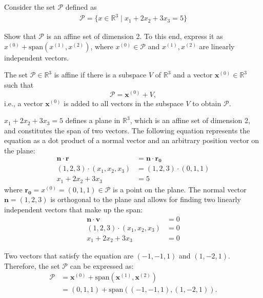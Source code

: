 \begin{homeworkProblem}

    Consider the set $\mathcal P$ defined as
    \[
        \begin{split}
            \mathcal P=\{x\in\mathbb R^3 \;|\; x_1+2x_2+3x_3=5\}
        \end{split}
    \]

    Show that $\mathcal P$ is an affine set of dimension 2. To this end, express 
    it as $x^{(0)}+\text{span}(x^{(1)},x^{(2)})$, where $x^{(0)}\in\mathcal P$ 
    and $x^{(1)},x^{(2)}$ are linearly independent vectors. 
    \\ 

    \begin{solution}
        The set $\mathcal{P} \in \mathbb{R}^3$ is affine if there is a subspace $V$
        of $\mathbb{R}^3$ and a vector $\boldsymbol{x}^{(0)} \in \mathbb{R}^3$ such that
        $$\mathcal{P} = \boldsymbol{x}^{(0)} + V,$$ i.e., a vector $\boldsymbol{x}^{(0)}$
        is added to all vectors in the subspace $V$ to obtain $\mathcal{P}$.

        $x_1 + 2x_2 + 3x_3 = 5$ defines a plane in $\mathbb{R}^3$, which is an affine set
        of dimension 2, and constitutes the span of two vectors. The following equation
        represents the equation as a dot product of a normal vector and an arbitrary
        position vector on the plane:
        \[
            \begin{split}
                \boldsymbol{n} \cdot \boldsymbol{r} &= \boldsymbol{n} \cdot \boldsymbol{r_0} \\
                (1, 2, 3) \cdot (x_1, x_2, x_3) &= (1, 2, 3) \cdot (0, 1, 1) \\ 
                x_1 + 2x_2 + 3x_3 &= 5
            \end{split}
        \]
        where $\boldsymbol{r_0} = x^{(0)} = (0, 1, 1) \in \mathcal{P}$ is a point on the plane.
        The normal vector $\boldsymbol{n} = (1, 2, 3)$ is orthogonal to the plane and allows
        for finding two linearly independent vectors that make up the span:
        \[
            \begin{split}
                \boldsymbol{n} \cdot \boldsymbol{v} &= 0 \\
                (1, 2, 3) \cdot (x_1, x_2, x_3) &= 0 \\
                x_1 + 2x_2 + 3x_3 &= 0
            \end{split}
        \]

        Two vectors that satisfy the equation are $(-1, -1, 1)$ and $(1, -2, 1)$. 
        Therefore, the set $\mathcal{P}$ can be expressed as:
        \[
            \begin{split}
                \mathcal{P} &= \boldsymbol{x}^{(0)} + \text{span}(\boldsymbol{x}^{(1)}, \boldsymbol{x}^{(2)}) \\
                &= (0, 1, 1) + \text{span}((-1, -1, 1), (1, -2, 1)).
            \end{split}
        \]
        
    \end{solution}

\end{homeworkProblem}